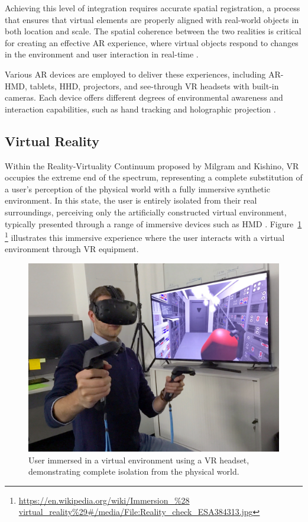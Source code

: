     Achieving this level of integration requires accurate spatial registration, a process that ensures that virtual elements are properly aligned with real-world objects in both location and scale. The spatial coherence between the two realities is critical for creating an effective \ac{AR} experience, where virtual objects respond to changes in the environment and user interaction in real-time \cite{whatismixedreality}. 

    Various \ac{AR} devices are employed to deliver these experiences, including \ac{AR}-\ac{HMD}, tablets, \ac{HHD}, projectors, and see-through \ac{VR} headsets with built-in cameras. Each device offers different degrees of environmental awareness and interaction capabilities, such as hand tracking and holographic projection \cite{Yin2023}. 

\subsection{Virtual Reality}
    
    Within the Reality-Virtuality Continuum proposed by Milgram and Kishino, \ac{VR} occupies the extreme end of the spectrum, representing a complete substitution of a user’s perception of the physical world with a fully immersive synthetic environment. In this state, the user is entirely isolated from their real surroundings, perceiving only the artificially constructed virtual environment, typically presented through a range of immersive devices such as \ac{HMD} \cite{milgram1994}. Figure~\ref{f:real-virtual-continuum} \footnote{\url{https://en.wikipedia.org/wiki/Immersion_\%28
    virtual_reality\%29\#/media/File:Reality_check_ESA384313.jpg}} illustrates this immersive experience where the user interacts with a virtual environment through \ac{VR} equipment.

    \begin{figure}[h]
        \centering
        \includegraphics[width=0.6\linewidth]{figs/Reality_check_ESA384313.jpg}
        \caption{User immersed in a virtual environment using a VR headset, demonstrating complete isolation from the physical world.}
        \label{f:real-virtual-continuum}
    \end{figure}

